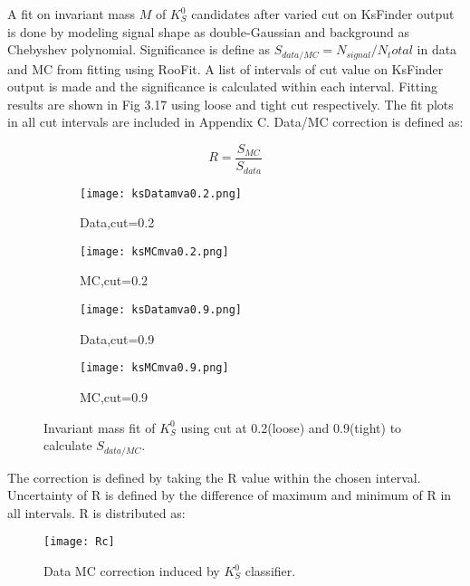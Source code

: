 A fit on invariant mass $M$ of $K_S^0$ candidates after varied cut on KsFinder output is done by modeling signal shape as double-Gaussian and background as Chebyshev polynomial. Significance is define as $S_{data/MC} = N_{signal} /N_total$ in data and MC from fitting using RooFit. A list of intervals of cut value on KsFinder output is made and the significance is calculated within each interval. Fitting results are shown in Fig 3.17 using loose and tight cut respectively. The fit plots in all cut intervals are included in Appendix C.  Data/MC correction is defined as:

\begin{equation}
	R = \frac{S_{MC}}{S_{data}}
\end{equation}



\begin{figure}[htpb]
	\begin{subfigure}{0.5\linewidth}
		\caption{Data,cut=0.2}
		\texttt{[image: ksDatamva0.2.png]}
	\end{subfigure}
\begin{subfigure}{0.5\linewidth}
	\caption{MC,cut=0.2}
	\texttt{[image: ksMCmva0.2.png]}
\end{subfigure}

\begin{subfigure}{0.5\linewidth}
	\caption{Data,cut=0.9}
	\texttt{[image: ksDatamva0.9.png]}
\end{subfigure}
\begin{subfigure}{0.5\linewidth}
	\caption{MC,cut=0.9}
	\texttt{[image: ksMCmva0.9.png]}
\end{subfigure}
\caption{Invariant mass fit of $K_S^0$ using cut at 0.2(loose) and 0.9(tight) to calculate $S_{data/MC}$.}
\end{figure}

The correction is defined by taking the R value within the chosen interval. Uncertainty of R is defined by the difference of maximum and minimum of R in all intervals. R is distributed as: 
\begin{figure}[H]
	\centering 
	\texttt{[image: Rc]}
	\caption{Data MC correction induced by $K_S^0$ classifier.}
\end{figure}

